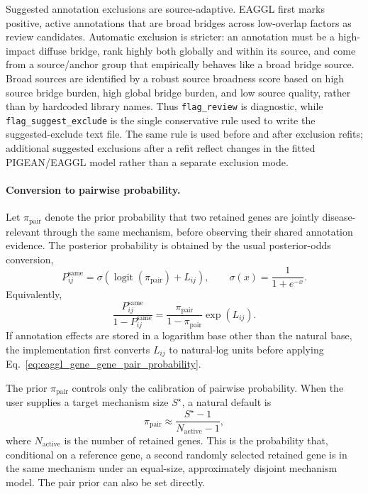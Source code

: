 \documentclass[11pt]{article}
\begin{document}
Suggested annotation exclusions are source-adaptive. EAGGL first marks positive,
active annotations that are broad bridges across low-overlap factors as review
candidates. Automatic exclusion is stricter: an annotation must be a high-impact
diffuse bridge, rank highly both globally and within its source, and come from a
source/anchor group that empirically behaves like a broad bridge source. Broad sources
are identified by a robust source broadness score based on high source bridge burden,
high global bridge burden, and low source quality, rather than by hardcoded library
names. Thus \texttt{flag\_review} is diagnostic, while \texttt{flag\_suggest\_exclude} is the single
conservative rule used to write the suggested-exclude text file. The same rule is used
before and after exclusion refits; additional suggested exclusions after a refit reflect
changes in the fitted PIGEAN/EAGGL model rather than a separate exclusion mode.

\paragraph{Conversion to pairwise probability.}
Let $\pi_{\mathrm{pair}}$ denote the prior probability that two retained genes are
jointly disease-relevant through the same mechanism, before observing their shared
annotation evidence. The posterior probability is obtained by the usual posterior-odds
conversion,
\begin{equation}
P_{ij}^{\mathrm{same}}
= \sigma\left(\operatorname{logit}(\pi_{\mathrm{pair}}) + L_{ij}\right),
\qquad
\sigma(x)=\frac{1}{1+e^{-x}}.
\label{eq:eaggl_gene_gene_pair_probability}
\end{equation}
Equivalently,
\begin{equation}
\frac{P_{ij}^{\mathrm{same}}}{1-P_{ij}^{\mathrm{same}}}
=
\frac{\pi_{\mathrm{pair}}}{1-\pi_{\mathrm{pair}}}\exp(L_{ij}).
\label{eq:eaggl_gene_gene_pair_odds}
\end{equation}
If annotation effects are stored in a logarithm base other than the natural base, the
implementation first converts $L_{ij}$ to natural-log units before applying
Eq.~\eqref{eq:eaggl_gene_gene_pair_probability}.

The prior $\pi_{\mathrm{pair}}$ controls only the calibration of pairwise probability.
When the user supplies a target mechanism size $S^\star$, a natural default is
\begin{equation}
\pi_{\mathrm{pair}}
\approx \frac{S^\star-1}{N_{\mathrm{active}}-1},
\label{eq:eaggl_gene_gene_pair_prior_from_size}
\end{equation}
where $N_{\mathrm{active}}$ is the number of retained genes. This is the probability
that, conditional on a reference gene, a second randomly selected retained gene is in
the same mechanism under an equal-size, approximately disjoint mechanism model. The
pair prior can also be set directly.
\end{document}
